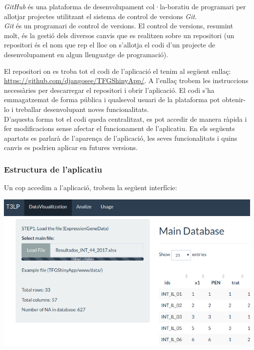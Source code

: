 \documentclass[english]{article}
\begin{document}
\textit{GitHub} és una plataforma de desenvolupament col·la-boratiu de programari per allotjar projectes utilitzant el sistema de control de versions \textit{Git}.
\\

\textit{Git} és un programari de control de versions. El control de versions, resumint molt, és la gestió dels diversos canvis que es realitzen sobre un repositori (un repositori és el nom que rep el lloc on s'allotja el codi d'un projecte de desenvolupament en algun llenguatge de programació).

\newpage
El repositori on es troba tot el codi de l'aplicació el tenim al següent enlla\c{c}: \url{https://github.com/djangosee/TFGShinyApp/}.
A l'enlla\c{c} trobem les instruccions necessàries per descarregar el repositori i obrir l'aplicació. El codi s'ha emmagatzemat de forma pública i qualsevol usuari de la plataforma pot obtenir-lo i treballar desenvolupant noves funcionalitats.
\\

D'aquesta forma tot el codi queda centralitzat, es pot accedir de manera ràpida i fer modificacions sense afectar el funcionament de l'aplicatiu. En els següents apartats es parlarà de l'aparen\c{c}a de l'aplicació, les seves funcionalitats i quins canvis es podrien aplicar en futures versions.
\subsubsection{Estructura de l'aplicatiu}
Un cop accedim a l'aplicació, trobem la següent interfície:
\begin{center}
\includegraphics[scale=0.3]{app1.png}
\end{center}
\end{document}

